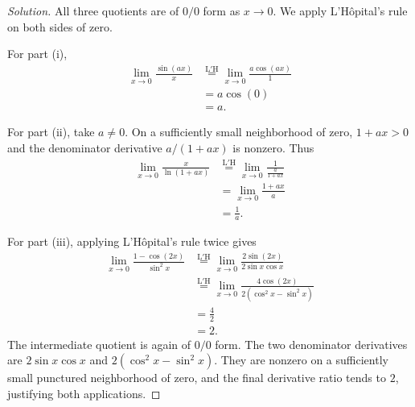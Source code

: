 \begin{proof}[Solution]
  All three quotients are of $0/0$ form as
  $x\to0$. We apply L'H\^opital's rule on both sides of zero.

  For part (i),
  \[
    \begin{aligned}
      \lim_{x\to0}\frac{\sin(ax)}x
        &\overset{\mathrm{L'H}}{=}
          \lim_{x\to0}\frac{a\cos(ax)}1\\
        &=a\cos(0)\\
        &=a.
    \end{aligned}
  \]

  For part (ii), take $a\ne0$.
  On a sufficiently small neighborhood of
  zero, $1+ax>0$ and the denominator derivative
  $a/(1+ax)$ is nonzero. Thus
  \[
    \begin{aligned}
      \lim_{x\to0}\frac{x}{\ln(1+ax)}
        &\overset{\mathrm{L'H}}{=}
          \lim_{x\to0}\frac1{\frac{a}{1+ax}}\\
        &=\lim_{x\to0}\frac{1+ax}{a}\\
        &=\frac1a.
    \end{aligned}
  \]

  For part (iii), applying L'H\^opital's rule twice gives
  \[
    \begin{aligned}
      \lim_{x\to0}\frac{1-\cos(2x)}{\sin^2x}
        &\overset{\mathrm{L'H}}{=}
          \lim_{x\to0}\frac{2\sin(2x)}{2\sin x\cos x}\\
        &\overset{\mathrm{L'H}}{=}
          \lim_{x\to0}\frac{4\cos(2x)}
            {2(\cos^2x-\sin^2x)}\\
        &=\frac42\\
        &=2.
    \end{aligned}
  \]
  The intermediate quotient is again of $0/0$
  form. The two denominator derivatives are $2\sin x\cos x$ and
  $2(\cos^2x-\sin^2x)$. They are nonzero on a sufficiently small
  punctured neighborhood of zero, and the final derivative ratio
  tends to $2$, justifying both applications.
\end{proof}
